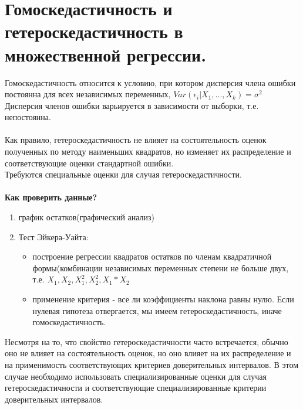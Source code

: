\documentclass{article}
\begin{document}
	\section{Гомоскедастичность и гетероскедастичность в множественной регрессии.}
	Гомоскедастичность относится к условию, при котором дисперсия члена ошибки постоянна для всех независимых переменных, $ Var(\epsilon_{i}| X_1, ..., X_k) = \sigma^{2}$  
	\\
	Дисперсия членов ошибки варьируется в зависимости от выборки, т.е. непостоянна.
	\\
	\\
	Как правило, гетероскедастичность не влияет на состоятельность оценок полученных по методу наименьших квадратов, но изменяет их распределение и соответствующие оценки стандартной ошибки. 
	\\
	Требуются специальные оценки для случая гетероскедастичности.
	\\
	\\
	\textbf{Как проверить данные?}
	\begin{enumerate}
		\item график остатков(графический анализ) 
		\item Тест Эйкера-Уайта: 
			\begin{itemize}
				\item построение регрессии квадратов остатков по членам квадратичной формы(комбинации независимых переменных степени не больше двух, т.е. $ X_1,X_2, X_1^{2},X_2^{2}, X_1*X_2$
				\item применение критерия - все ли коэффициенты наклона равны нулю. 
				Если нулевая гипотеза отвергается, мы имеем гетероскедастичность, иначе гомоскедастичность.
			\end{itemize}
	\end{enumerate}
	Несмотря на то, что свойство гетероскедастичности часто встречается, обычно оно не влияет на состоятельность оценок, но оно влияет на их распределение и на применимость соответствующих критериев доверительных интервалов. В этом случае необходимо использовать специализированные оценки для случая гетероскедастичности  и соответствующие специализированные критерии доверительных интервалов. 
	
	
\end{document}

